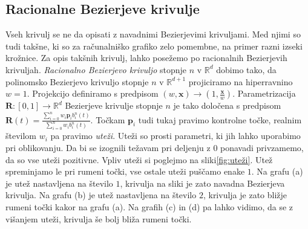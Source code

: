 \documentclass[isrm2, tisk]{fmfdelo}
\newcommand{\R}{\mathbb R}
\newcommand{\p}{\textbf{p}}
\begin{document}
    \subsection{Racionalne Bezierjeve krivulje}
    Vseh krivulj se ne da opisati z navadnimi Bezierjevimi krivuljami.
    Med njimi so tudi takšne, ki so za računalniško grafiko zelo pomembne, na primer razni izseki krožnice.
    Za opis takšnih krivulj, lahko posežemo po racionalnih Bezierjevih krivuljah.
    \textit{Racionalno Bezierjevo krivuljo} stopnje $n$ v $\R^d$ dobimo tako, da polinomsko Bezierjevo krivuljo stopnje $n$ v $\R^{d+1}$ projiciramo na hiperravnino $w=1$.
    Projekcijo definiramo s predpisom $(w,\mathbf{x})\to(1,\frac{\mathbf{x}}{w})$.
    Parametrizacija $\mathbf{R}:[0,1]\to \R^d$ Bezierjeve krivulje stopnje $n$ je tako določena s predpisom $\mathbf{R}(t) = \frac{\sum^{n}_{i=0}w_i\p_i b^n_i(t)}{\sum^{n}_{i=0}w_i b^n_i(t)}$.
    Točkam $\p_i$ tudi tukaj pravimo kontrolne točke, realnim številom $w_i$ pa pravimo \textit{uteži}.
    Uteži so prosti parametri, ki jih lahko uporabimo pri oblikovanju.
    Da bi se izognili težavam pri deljenju z $0$ ponavadi privzamemo, da so vse uteži pozitivne.
    Vpliv uteži si poglejmo na sliki\ref{fig:uteži}.
    Utež spreminjamo le pri rumeni točki, vse ostale uteži puščamo enake $1$.
    Na grafu (a) je utež nastavljena na število $1$, krivulja na sliki je zato navadna Bezierjeva krivulja.
    Na grafu (b) je utež nastavljena na število $2$, krivulja je zato bližje rumeni točki kakor na grafu (a).
    Na grafih (c) in (d) pa lahko vidimo, da se z višanjem uteži, krivulja še bolj bliža rumeni točki.
\end{document}
